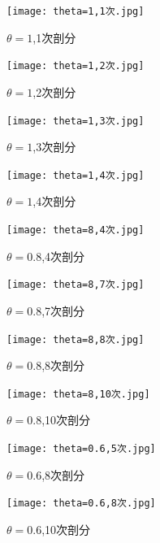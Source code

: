 \documentclass[12pt,fontset=mac]{ctexart}
\begin{document}
\begin{figure}[H]
	\centering
	\begin{minipage}[t]{0.48\textwidth}
		\centering
		\texttt{[image: theta=1,1次.jpg]}
		\caption{$\theta=1$,1次剖分}
	\end{minipage}
	\begin{minipage}[t]{0.48\textwidth}
		\centering
		\texttt{[image: theta=1,2次.jpg]}
		\caption{$\theta=1$,2次剖分}
	\end{minipage}
\end{figure}
\begin{figure}[H]
	\centering
	\begin{minipage}[t]{0.48\textwidth}
		\centering
		\texttt{[image: theta=1,3次.jpg]}
		\caption{$\theta=1$,3次剖分}
	\end{minipage}
	\begin{minipage}[t]{0.48\textwidth}
		\centering
		\texttt{[image: theta=1,4次.jpg]}
		\caption{$\theta=1$,4次剖分}
	\end{minipage}
\end{figure}
\begin{figure}[H]
	\centering
	\begin{minipage}[t]{0.48\textwidth}
		\centering
		\texttt{[image: theta=8,4次.jpg]}
		\caption{$\theta=0.8$,4次剖分}
	\end{minipage}
	\begin{minipage}[t]{0.48\textwidth}
		\centering
		\texttt{[image: theta=8,7次.jpg]}
		\caption{$\theta=0.8$,7次剖分}
	\end{minipage}
\end{figure}
\begin{figure}[H]
	\centering
	\begin{minipage}[t]{0.48\textwidth}
		\centering
		\texttt{[image: theta=8,8次.jpg]}
		\caption{$\theta=0.8$,8次剖分}
	\end{minipage}
	\begin{minipage}[t]{0.48\textwidth}
		\centering
		\texttt{[image: theta=8,10次.jpg]}
		\caption{$\theta=0.8$,10次剖分}
		\end{minipage}
	\end{figure}
\begin{figure}[H]
	\centering
	\begin{minipage}[t]{0.48\textwidth}
		\centering
		\texttt{[image: theta=0.6,5次.jpg]}
		\caption{$\theta=0.6$,8次剖分}
	\end{minipage}
	\begin{minipage}[t]{0.48\textwidth}
		\centering
		\texttt{[image: theta=0.6,8次.jpg]}
		\caption{$\theta=0.6$,10次剖分}
	\end{minipage}
\end{figure}
\end{document}
